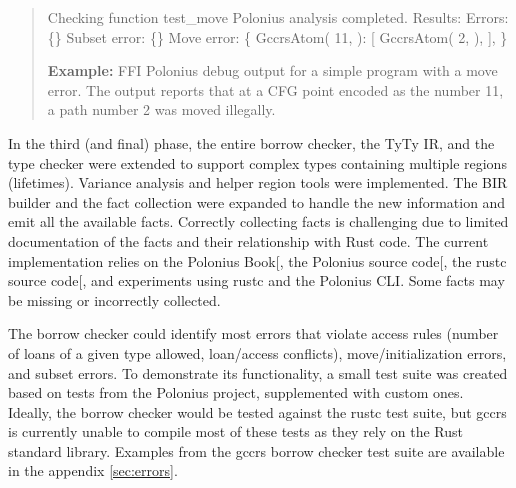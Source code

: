 \documentclass[
  11pt,
  twoside]{report}
\newenvironment{Shaded}{}{}
\newcommand{\DecValTok}[1]{#1}
\newcommand{\NormalTok}[1]{#1}
\newcommand{\OperatorTok}[1]{#1}
\begin{document}
\begin{quote}
\begin{Shaded}
\begin{Highlighting}[]
\NormalTok{[}\DecValTok{34}\OperatorTok{/}\DecValTok{35}\NormalTok{] Checking function test\_move}
\NormalTok{Polonius analysis completed}\OperatorTok{.}\NormalTok{ Results}\OperatorTok{:}
\NormalTok{Errors}\OperatorTok{:} \OperatorTok{\{\}}
\NormalTok{Subset error}\OperatorTok{:} \OperatorTok{\{\}}
\NormalTok{Move error}\OperatorTok{:} \OperatorTok{\{}
\NormalTok{   GccrsAtom(}
       \DecValTok{11}\OperatorTok{,}
\NormalTok{   )}\OperatorTok{:}\NormalTok{ [}
\NormalTok{       GccrsAtom(}
           \DecValTok{2}\OperatorTok{,}
\NormalTok{       )}\OperatorTok{,}
\NormalTok{   ]}\OperatorTok{,}
\OperatorTok{\}}
\end{Highlighting}
\end{Shaded}

\textbf{Example:} FFI Polonius debug output for a simple program with a
move error. The output reports that at a CFG point encoded as the number
11, a path number 2 was moved illegally.
\end{quote}

In the third (and final) phase, the entire borrow checker, the TyTy IR,
and the type checker were extended to support complex types containing
multiple regions (lifetimes). Variance analysis and helper region tools
were implemented. The BIR builder and the fact collection were expanded
to handle the new information and emit all the available facts.
Correctly collecting facts is challenging due to limited documentation
of the facts and their relationship with Rust code. The current
implementation relies on the Polonius
Book{[}\citeproc{ref-polonius}{10}{]}, the Polonius source
code{[}\citeproc{ref-poloniusSource}{17}{]}, the rustc source
code{[}\citeproc{ref-rustcSource}{18}{]}, and experiments using rustc
and the Polonius CLI. Some facts may be missing or incorrectly
collected.

The borrow checker could identify most errors that violate access rules
(number of loans of a given type allowed, loan/access conflicts),
move/initialization errors, and subset errors. To demonstrate its
functionality, a small test suite was created based on tests from the
Polonius project, supplemented with custom ones. Ideally, the borrow
checker would be tested against the rustc test suite, but gccrs is
currently unable to compile most of these tests as they rely on the Rust
standard library. Examples from the gccrs borrow checker test suite are
available in the appendix \ref{sec:errors}.
\end{document}

